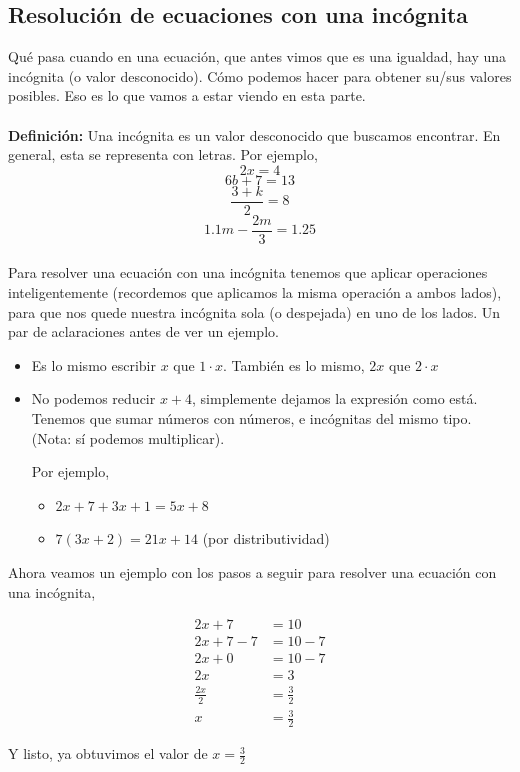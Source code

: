 \documentclass{article}
\begin{document}
\subsection{Resolución de ecuaciones con una incógnita}
\begin{normalsize}
Qué pasa cuando en una ecuación, que antes vimos que es una igualdad, hay una incógnita (o valor desconocido). Cómo podemos hacer para obtener su/sus valores posibles. Eso es lo que vamos a estar viendo en esta parte.\\\\
\textbf{Definición:} Una incógnita es un valor desconocido que buscamos encontrar. En general, esta se representa con letras. Por ejemplo, 
\[2x=4\]
\[6b+7=13\]
\[\frac{3+k}{2}=8\]
\[1.1m-\frac{2m}{3}=1.25\]
\\
Para resolver una ecuación con una incógnita tenemos que aplicar operaciones inteligentemente (recordemos que aplicamos la misma operación a ambos lados), para que nos quede nuestra incógnita sola (o despejada) en uno de los lados.
Un par de aclaraciones antes de ver un ejemplo.
\begin{itemize}
	\item Es lo mismo escribir $x$ que $1\cdot x$. También es lo mismo, $2x$ que $2\cdot x$
	\item No podemos reducir $x+4$, simplemente dejamos la expresión como está. Tenemos que sumar números con números, e incógnitas del mismo tipo. (Nota: sí podemos multiplicar).
	
	Por ejemplo,
	\begin{itemize}
		\item $2x+7+3x+1=5x+8$
		\item $7(3x+2)=21x+14$ (por distributividad)
	\end{itemize}
\end{itemize}

Ahora veamos un ejemplo con los pasos a seguir para resolver una ecuación con una incógnita,

\begin{align}
2x+7 &= 10\\2x+7-7&=10-7\\2x+0&=10-7\\2x&=3\\\frac{2x}{2}&=\frac{3}{2}\\x&=\frac{3}{2}
\end{align}

Y listo, ya obtuvimos el valor de $x=\frac{3}{2}$\\


\end{normalsize}
\end{document}

